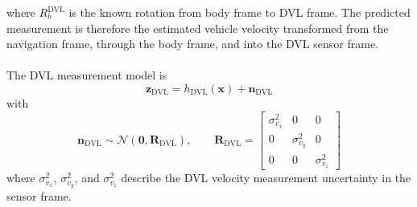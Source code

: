where $R_b^{\text{DVL}}$ is the known rotation from body frame to DVL frame. The predicted measurement is therefore the estimated vehicle velocity transformed from the navigation frame, through the body frame, and into the DVL sensor frame.
\\ \\
The DVL measurement model is
$$
    \mathbf{z}_{\text{DVL}} = h_{\text{DVL}}(\mathbf{x}) + \mathbf{n}_{\text{DVL}}
$$
with
\begin{equation}
    \mathbf{n}_{\text{DVL}} \sim \mathcal{N}(\mathbf{0}, \mathbf{R}_{\text{DVL}}),
    \qquad
    \mathbf{R}_{\text{DVL}} =
    \begin{bmatrix}
        \sigma_{v_x}^2 & 0 & 0 \\
        0 & \sigma_{v_y}^2 & 0 \\
        0 & 0 & \sigma_{v_z}^2
    \end{bmatrix}
    \label{eq:aiding-measurement-model-dvl-noise}
\end{equation}
where $\sigma_{v_x}^2$, $\sigma_{v_y}^2$, and $\sigma_{v_z}^2$ describe the DVL velocity measurement uncertainty in the sensor frame.



